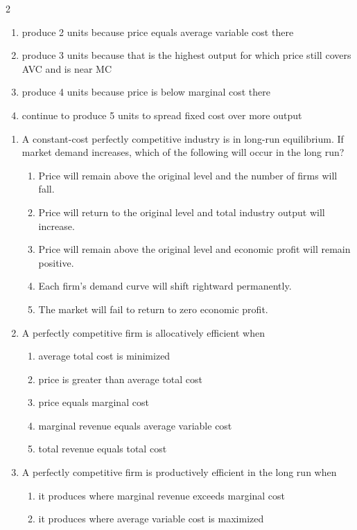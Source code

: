 \documentclass[10pt]{article}
\newenvironment{choiceslist}
  {\begin{enumerate}[label=(\Alph*), leftmargin=1.6em, itemsep=0.12em, topsep=0.18em, parsep=0pt]}
  {\end{enumerate}}
\begin{document}
\begin{multicols*}{2}
\begin{enumerate}[resume*=apq, leftmargin=*, itemsep=0.85em, topsep=0.2em, parsep=0pt]
\begin{choiceslist}
\item produce 2 units because price equals average variable cost there
\item produce 3 units because that is the highest output for which price still covers AVC and is near MC
\item produce 4 units because price is below marginal cost there
\item continue to produce 5 units to spread fixed cost over more output
\end{choiceslist}
\end{enumerate}
\begin{enumerate}[resume*=apq, leftmargin=*, itemsep=0.85em, topsep=0.2em, parsep=0pt]
\item A constant-cost perfectly competitive industry is in long-run equilibrium. If market demand increases, which of the following will occur in the long run?
\begin{choiceslist}
\item Price will remain above the original level and the number of firms will fall.
\item Price will return to the original level and total industry output will increase.
\item Price will remain above the original level and economic profit will remain positive.
\item Each firm's demand curve will shift rightward permanently.
\item The market will fail to return to zero economic profit.
\end{choiceslist}
\item A perfectly competitive firm is allocatively efficient when
\begin{choiceslist}
\item average total cost is minimized
\item price is greater than average total cost
\item price equals marginal cost
\item marginal revenue equals average variable cost
\item total revenue equals total cost
\end{choiceslist}
\item A perfectly competitive firm is productively efficient in the long run when
\begin{choiceslist}
\item it produces where marginal revenue exceeds marginal cost
\item it produces where average variable cost is maximized

\end{choiceslist}
\end{enumerate}
\end{multicols*}
\end{document}
